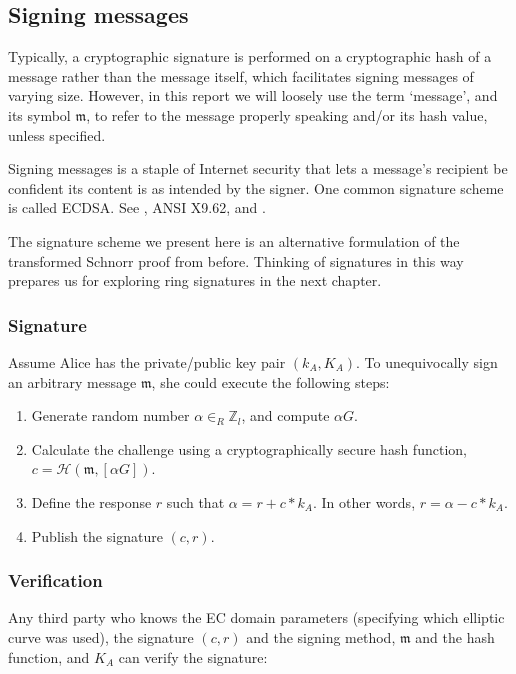 \subsection{Signing messages}
\label{sec:signing-messages}

Typically, a cryptographic signature is performed on a cryptographic hash of a message rather than the message itself, which facilitates signing messages of varying size. However, in this report we will loosely use the term `message', and its symbol $\mathfrak{m}$, to refer to the message properly speaking and/or its hash value, unless specified.

Signing messages is a staple of Internet security that lets a message's recipient be confident its content is as intended by the signer. One common signature scheme is called ECDSA. See \cite{ecdsa}, ANSI X9.62, and \cite{Hankerson:2003:GEC:940321}.

The signature scheme we present here is an alternative formulation of the transformed Schnorr proof from before. Thinking of signatures in this way prepares us for exploring ring signatures in the next chapter.

\subsubsection*{Signature}

Assume Alice has the private/public key pair \((k_A, K_A)\). To unequivocally sign an arbitrary message $\mathfrak{m}$, she could execute the following steps:

\begin{enumerate}
	\item Generate random number $\alpha \in_R \mathbb{Z}_l$, and compute $\alpha G$.
	\item Calculate the challenge using a cryptographically secure hash function, \(c = \mathcal{H}(\mathfrak{m},[\alpha G])\).
	\item Define the response $r$ such that $\alpha = r + c*k_A$. In other words, $r = \alpha - c*k_A$.
	\item Publish the signature $(c, r)$.
\end{enumerate}

\subsubsection*{Verification}

Any third party who knows the EC domain parameters (specifying which elliptic curve was used), the signature $(c, r)$ and the signing method, $\mathfrak{m}$ and the hash function, and $K_A$ can verify the signature:

